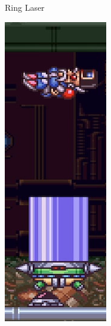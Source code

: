 \begin{figure}[htp]
\begin{minipage}{.5\linewidth}
\begin{subfigure}{\linewidth}
			\caption{Ring Laser}
		\end{subfigure}
	\end{minipage}
	\begin{minipage}{0.255\linewidth}		
		\begin{subfigure}[t]{\linewidth}
			\centering
			\includegraphics[width=\linewidth]{figures/X2/Hunter_stages/Serges_barrier_jump.png}

\end{subfigure}
\end{minipage}
\end{figure}
